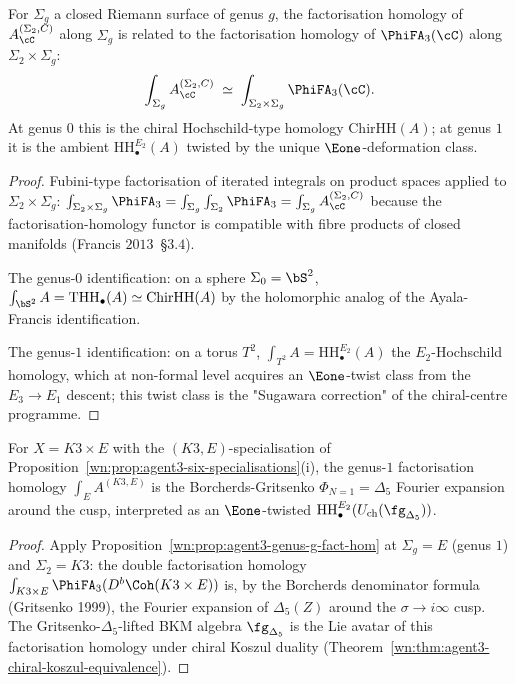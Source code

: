 \begin{proposition}
\label{wn:prop:agent3-genus-g-fact-hom}
\ClaimStatusProvedHere
For $\Sigma_g$ a closed Riemann surface of genus $g$, the factorisation homology of $A^{(\Sigma_2,C)}_\cC$ along $\Sigma_g$ is related to the factorisation homology of $\PhiFA_3(\cC)$ along $\Sigma_2\times\Sigma_g$:
\[
 \int_{\Sigma_g}A^{(\Sigma_2,C)}_\cC
 \;\simeq\;
 \int_{\Sigma_2\times\Sigma_g}\PhiFA_3(\cC).
\]
At genus $0$ this is the chiral Hochschild-type homology $\mathrm{ChirHH}(A)$; at genus $1$ it is the ambient $\mathrm{HH}_\bullet^{E_2}(A)$ twisted by the unique $\Eone$-deformation class.
\end{proposition}

\begin{proof}
Fubini-type factorisation of iterated integrals on product spaces applied to $\Sigma_2\times\Sigma_g$: $\int_{\Sigma_2\times\Sigma_g}\PhiFA_3=\int_{\Sigma_g}\int_{\Sigma_2}\PhiFA_3=\int_{\Sigma_g}A^{(\Sigma_2,C)}_\cC$ because the factorisation-homology functor is compatible with fibre products of closed manifolds (Francis $2013$~\S$3.4$).

The genus-$0$ identification: on a sphere $\Sigma_0=\bS^2$, $\int_{\bS^2}A=\mathrm{THH}_\bullet(A)\simeq\mathrm{ChirHH}(A)$ by the holomorphic analog of the Ayala-Francis identification.

The genus-$1$ identification: on a torus $T^2$, $\int_{T^2}A=\mathrm{HH}_\bullet^{E_2}(A)$ the $E_2$-Hochschild homology, which at non-formal level acquires an $\Eone$-twist class from the $E_3\to E_1$ descent; this twist class is the "Sugawara correction" of the chiral-centre programme.
\end{proof}

\begin{corollary}
\label{wn:cor:agent3-k3e-modular-ascent}
\ClaimStatusProvedHere
For $X=K3\times E$ with the $(K3,E)$-specialisation of Proposition~\ref{wn:prop:agent3-six-specialisations}(i), the genus-$1$ factorisation homology $\int_{E}A^{(K3,E)}$ is the Borcherds-Gritsenko $\Phi_{N=1}=\Delta_5$ Fourier expansion around the cusp, interpreted as an $\Eone$-twisted $\mathrm{HH}_\bullet^{E_2}(U_{\mathrm{ch}}(\fg_{\Delta_5}))$.
\end{corollary}

\begin{proof}
Apply Proposition~\ref{wn:prop:agent3-genus-g-fact-hom} at $\Sigma_g=E$ (genus $1$) and $\Sigma_2=K3$: the double factorisation homology $\int_{K3\times E}\PhiFA_3(D^b\Coh(K3\times E))$ is, by the Borcherds denominator formula (Gritsenko 1999), the Fourier expansion of $\Delta_5(Z)$ around the $\sigma\to i\infty$ cusp. The Gritsenko-$\Delta_5$-lifted BKM algebra $\fg_{\Delta_5}$ is the Lie avatar of this factorisation homology under chiral Koszul duality (Theorem~\ref{wn:thm:agent3-chiral-koszul-equivalence}).
\end{proof}

